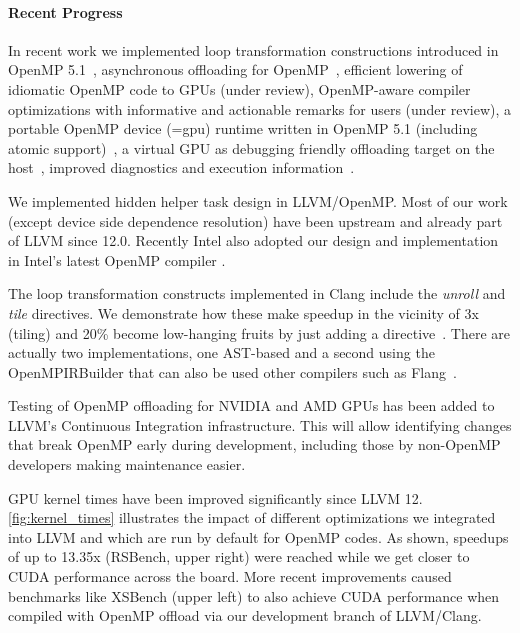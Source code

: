 \paragraph{Recent Progress}
In recent work we implemented loop transformation constructions introduced in OpenMP 5.1~\cite{kruse2021openmpbooth,kruse2021clangast}, asynchronous offloading for OpenMP~\cite{thiddenhelper}, efficient lowering of idiomatic OpenMP code to GPUs (under review),  OpenMP-aware compiler optimizations with informative and actionable remarks for users (under review), a portable OpenMP device (=gpu) runtime written in OpenMP 5.1 (including atomic support)~\cite{DBLP:conf/iwomp/TianCDC21}, a virtual GPU as debugging friendly
offloading target on the host~\cite{DBLP:conf/icppw/PatelTDC21}, improved diagnostics and execution information~\cite{DBLP:conf/icppw/DoerfertHC21,DBLP:conf/iwomp/HuberWGDH21}.

We implemented hidden helper task design in LLVM/OpenMP.
Most of our work \cite{DBLP:conf/iwomp/TianCDC21} (except device side dependence resolution) have been upstream and already part of LLVM since 12.0.
Recently Intel also adopted our design and implementation in Intel's latest OpenMP compiler \cite{TianUpdateOnIntelCompiler2021}.

The loop transformation constructs implemented in Clang include the \emph{unroll} and \emph{tile} directives.
We demonstrate how these make speedup in the vicinity of 3x (tiling) and 20\% become
low-hanging fruits by just adding a directive~\cite{kruse2021openmpbooth}.
There are actually two implementations, one AST-based and a second using the OpenMPIRBuilder that can also be used other compilers such as Flang~\cite{kruse2021clangast}.

Testing of OpenMP offloading for NVIDIA and AMD GPUs has been added to LLVM's Continuous Integration infrastructure.
This will allow identifying changes that break OpenMP early during development, including those by non-OpenMP developers making maintenance easier.

GPU kernel times have been improved significantly since LLVM 12. \autoref{fig:kernel_times} illustrates the impact of
different optimizations we integrated into LLVM and which are run by default for OpenMP codes. As shown, speedups
of up to 13.35x (RSBench, upper right) were reached while we get closer to CUDA
performance across the board. More recent improvements caused benchmarks like
XSBench (upper left) to also achieve CUDA performance when compiled with OpenMP
offload via our development branch of LLVM/Clang.

